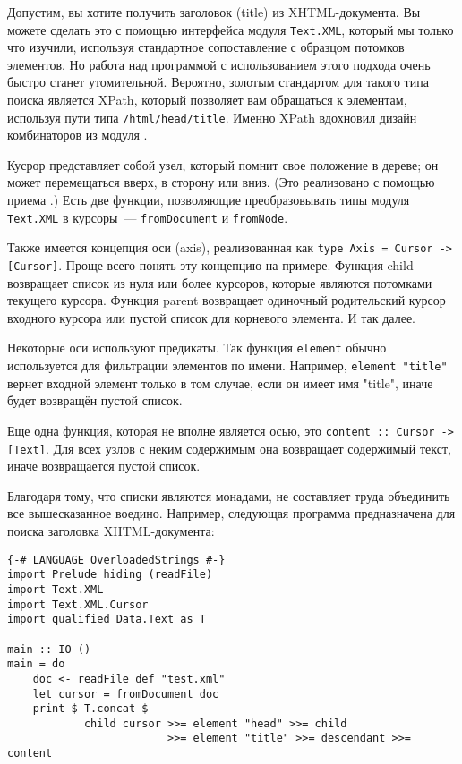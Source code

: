 Допустим, вы хотите получить заголовок (title) из XHTML-документа. Вы можете сделать это с помощью интерфейса модуля \lstinline!Text.XML!, который мы только что изучили, используя стандартное сопоставление с образцом потомков элементов. Но работа над программой с использованием этого подхода очень быстро станет утомительной. Вероятно, золотым стандартом для такого типа поиска является XPath, который позволяет вам обращаться к элементам, используя пути типа \lstinline!/html/head/title!. Именно XPath вдохновил дизайн комбинаторов из модуля .

Кусрор представляет собой узел, который помнит свое положение в дереве; он может перемещаться вверх, в сторону или вниз. (Это реализовано с помощью приема .) Есть две функции, позволяющие преобразовывать типы модуля \lstinline!Text.XML! в курсоры~--- \lstinline!fromDocument! и \lstinline!fromNode!.

Также имеется концепция оси (axis), реализованная как \lstinline!type Axis = Cursor -> [Cursor]!. Проще всего понять эту концепцию на примере. Функция child возвращает список из нуля или более курсоров, которые являются потомками текущего курсора. Функция parent возвращает одиночный родительский курсор входного курсора или пустой список для корневого элемента. И так далее.

Некоторые оси используют предикаты. Так функция \lstinline!element! обычно используется для фильтрации элементов по имени. Например, \lstinline!element "title"! вернет входной элемент только в том случае, если он имеет имя "title", иначе будет возвращён пустой список.

Еще одна функция, которая не вполне является осью, это \lstinline!content :: Cursor -> [Text]!. Для всех узлов с неким содержимым она возвращает содержимый текст, иначе возвращается пустой список.

Благодаря тому, что списки являются монадами, не составляет труда объединить все вышесказанное воедино. Например, следующая программа предназначена для поиска заголовка XHTML-документа:

\begin{lstlisting}
{-# LANGUAGE OverloadedStrings #-}
import Prelude hiding (readFile)
import Text.XML
import Text.XML.Cursor
import qualified Data.Text as T

main :: IO ()
main = do
    doc <- readFile def "test.xml"
    let cursor = fromDocument doc
    print $ T.concat $
            child cursor >>= element "head" >>= child
                         >>= element "title" >>= descendant >>= content
\end{lstlisting}

